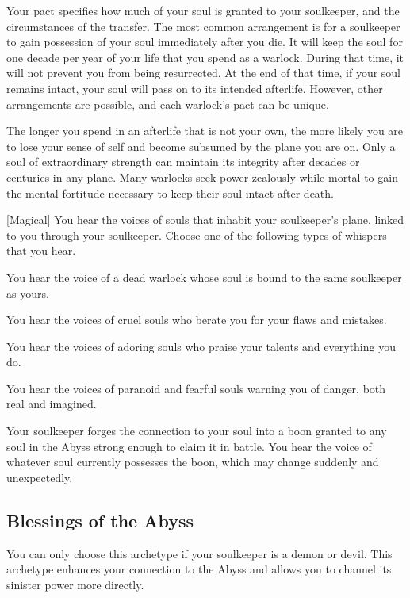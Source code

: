         Your pact specifies how much of your soul is granted to your soulkeeper, and the circumstances of the transfer.
        The most common arrangement is for a soulkeeper to gain possession of your soul immediately after you die.
        It will keep the soul for one decade per year of your life that you spend as a warlock.
        During that time, it will not prevent you from being resurrected.
        At the end of that time, if your soul remains intact, your soul will pass on to its intended afterlife.
        However, other arrangements are possible, and each warlock's pact can be unique.

        The longer you spend in an afterlife that is not your own, the more likely you are to lose your sense of self and become subsumed by the plane you are on.
        Only a soul of extraordinary strength can maintain its integrity after decades or centuries in any plane.
        Many warlocks seek power zealously while mortal to gain the mental fortitude necessary to keep their soul intact after death.

        [Magical]
        You hear the voices of souls that inhabit your soulkeeper's plane, linked to you through your soulkeeper.
        Choose one of the following types of whispers that you hear.
        {
             You hear the voice of a dead warlock whose soul is bound to the same soulkeeper as yours.

             You hear the voices of cruel souls who berate you for your flaws and mistakes.

             You hear the voices of adoring souls who praise your talents and everything you do.

             You hear the voices of paranoid and fearful souls warning you of danger, both real and imagined.

             Your soulkeeper forges the connection to your soul into a boon granted to any soul in the Abyss strong enough to claim it in battle.
            You hear the voice of whatever soul currently possesses the boon, which may change suddenly and unexpectedly.
        }

    \newpage
    \subsection{Blessings of the Abyss}
        You can only choose this archetype if your soulkeeper is a demon or devil.
        This archetype enhances your connection to the Abyss and allows you to channel its sinister power more directly.

